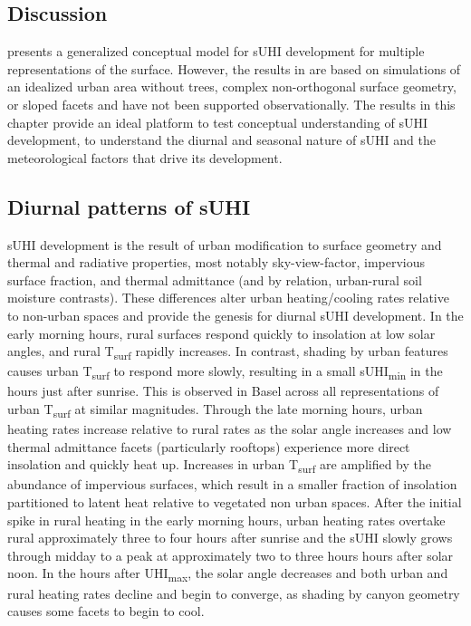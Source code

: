 \begin{bibunit}
\section{Discussion}
\citet{Oke2017} presents a generalized conceptual model for sUHI development for multiple representations of the surface. However, the results in \citet{Oke2017} are based on simulations of an idealized urban area without trees, complex non-orthogonal surface geometry, or sloped facets and have not been supported observationally. The results in this chapter provide an ideal platform to test conceptual understanding of sUHI development, to understand the diurnal and seasonal nature of sUHI and the meteorological factors that drive its development.

\subsection{Diurnal patterns of sUHI}
\label{gen}

sUHI development is the result of urban modification to surface geometry and thermal and radiative properties, most notably sky-view-factor, impervious surface fraction, and thermal admittance (and by relation, urban-rural soil moisture contrasts). These differences alter urban heating/cooling rates relative to non-urban spaces and provide the genesis for diurnal sUHI development. In the early morning hours, rural surfaces respond quickly to insolation at low solar angles, and rural T\textsubscript{surf} rapidly increases. In contrast, shading by urban features causes urban T\textsubscript{surf} to respond more slowly, resulting in a small sUHI\textsubscript{min} in the hours just after sunrise. This is observed in Basel across all representations of urban T\textsubscript{surf} at similar magnitudes. Through the late morning hours, urban heating rates increase relative to rural rates as the solar angle increases and low thermal admittance facets (particularly rooftops) experience more direct insolation and quickly heat up. Increases in urban T\textsubscript{surf} are amplified by the abundance of impervious surfaces, which result in a smaller fraction of insolation partitioned to latent heat relative to vegetated non urban spaces. After the initial spike in rural heating in the early morning hours, urban heating rates overtake rural approximately three to four hours after sunrise and the sUHI slowly grows through midday to a peak at approximately two to three hours hours after solar noon. In the hours after UHI\textsubscript{max}, the solar angle decreases and both urban and rural heating rates decline and begin to converge, as shading by canyon geometry causes some facets to begin to cool.


\end{bibunit}
